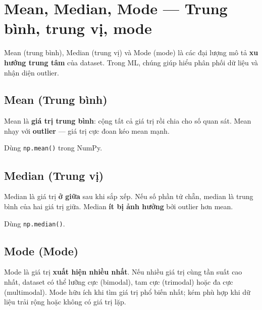 \section{Mean, Median, Mode --- Trung bình, trung vị, mode}
\label{sec:mean-median-mode}

\begin{dinhnghia}[title={Ba đo xu hướng trung tâm}]
Mean (trung bình), Median (trung vị) và Mode (mode) là các đại lượng mô tả \textbf{xu hướng trung tâm} của dataset.
Trong ML, chúng giúp hiểu phân phối dữ liệu và nhận diện outlier.
\end{dinhnghia}

\subsection{Mean (Trung bình)}

\begin{ynghia}[title={Mean}]
Mean là \textbf{giá trị trung bình}: cộng tất cả giá trị rồi chia cho số quan sát.
Mean nhạy với \textbf{outlier} --- giá trị cực đoan kéo mean mạnh.
\end{ynghia}

\begin{phuongphap}[title={Python}]
Dùng \texttt{np.mean()} trong NumPy.
\end{phuongphap}

\subsection{Median (Trung vị)}

\begin{ynghia}[title={Median}]
Median là giá trị \textbf{ở giữa} sau khi sắp xếp.
Nếu số phần tử chẵn, median là trung bình của hai giá trị giữa.
Median \textbf{ít bị ảnh hưởng} bởi outlier hơn mean.
\end{ynghia}

\begin{phuongphap}[title={Python}]
Dùng \texttt{np.median()}.
\end{phuongphap}

\subsection{Mode (Mode)}

\begin{ynghia}[title={Mode}]
Mode là giá trị \textbf{xuất hiện nhiều nhất}.
Nếu nhiều giá trị cùng tần suất cao nhất, dataset có thể lưỡng cực (bimodal), tam cực (trimodal) hoặc đa cực (multimodal).
Mode hữu ích khi tìm giá trị phổ biến nhất; kém phù hợp khi dữ liệu trải rộng hoặc không có giá trị lặp.
\end{ynghia}

